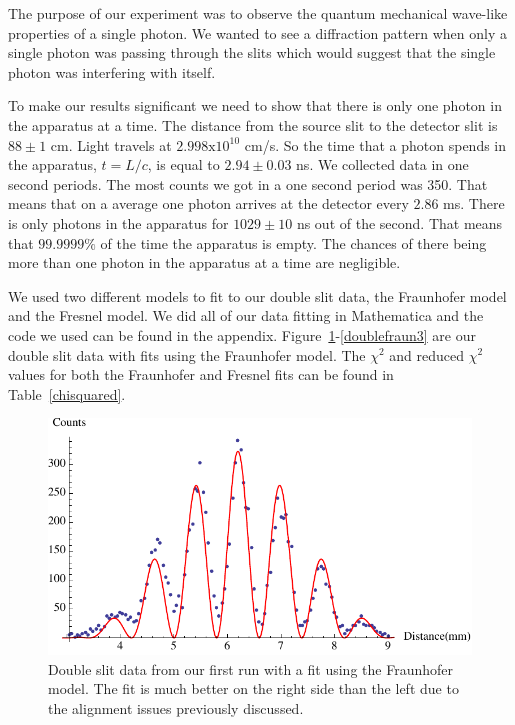 \documentclass[prb,preprint]{revtex4-1}
\begin{document}
The purpose of our experiment was to observe the quantum mechanical wave-like properties of a single photon. We wanted to see a diffraction pattern when only a single photon was passing through the slits which would suggest that the single photon was interfering with itself.

To make our results significant we need to show that there is only one photon in the apparatus at a time. The distance from the source slit to the detector slit is $88 \pm 1$ cm. Light travels at $2.998 \text{x} 10^{10}$ cm/s. So the time that a photon spends in the apparatus, $t = L/c$, is equal to $2.94 \pm 0.03$ ns. We collected data in one second periods. The most counts we got in a one second period was 350. That means that on a average one photon arrives at the detector every $2.86$ ms. There is only photons in the apparatus for $1029 \pm 10$ ns out of the second. That means that $99.9999\%$ of the time the apparatus is empty. The chances of there being more than one photon in the apparatus at a time are negligible.

We used two different models to fit to our double slit data, the Fraunhofer model and the Fresnel model. We did all of our data fitting in Mathematica and the code we used can be found in the appendix. Figure~\ref{doublefraun1}-\ref{doublefraun3} are our double slit data with fits using the Fraunhofer model. The $\chi^2$ and reduced $\chi^2$ values for both the Fraunhofer and Fresnel fits can be found in Table~\ref{chisquared}.

\begin{figure}[h!]
\centering
\includegraphics[width=6in]{doublefraun1.pdf}
\caption{Double slit data from our first run with a fit using the Fraunhofer model. The fit is much better on the right side than the left due to the alignment issues previously discussed.}
\label{doublefraun1}
\end{figure}
\end{document}
